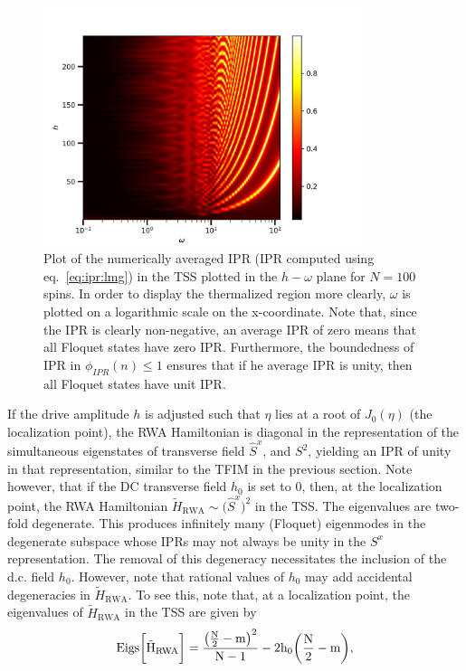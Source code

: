 \documentclass[%
reprint,
superscriptaddress,
amsmath,amssymb,
aps,
prb,
showkeys,
]{revtex4-2}
\begin{document}
\begin{figure}[t!]
	\centering
	\includegraphics[width=9.3cm]{wh_phasespace.jpeg}
	\caption{Plot of the numerically averaged IPR (IPR computed using eq.~\ref{eq:ipr:lmg}) in the TSS plotted in the $h-\omega$ plane for $N=100$ spins. In order to display the thermalized region more clearly, $\omega$ is plotted on a logarithmic scale on the x-coordinate. Note that, since the IPR is clearly non-negative, an average IPR of zero means that all Floquet states have zero IPR. Furthermore, the boundedness of IPR in $\phi_{IPR}(n) \leq 1$ ensures that if he average IPR is unity, then all Floquet states have unit IPR.}
	\label{fig:lmg_phasediag}
\end{figure}
If the drive amplitude $h$ is adjusted such that $\eta$ lies at a root of $J_0(\eta)$ (the localization point), the RWA Hamiltonian is diagonal in the representation of the simultaneous eigenstates of transverse field $\hat{S}^x$, and $S^2$, yielding an IPR of unity in that representation, similar to the TFIM in the previous section. Note however, that if the DC transverse field $h_0$ is set to $0$, then, at the localization point, the RWA Hamiltonian $\tilde{H}_{\mathrm{RWA}}\sim
\big(\hat{S}^x\big)^2$ in the TSS. The eigenvalues are two-fold degenerate. This produces infinitely many (Floquet) eigenmodes in the degenerate subspace whose IPRs may not always be unity in the $S^x$ representation. The removal of this degeneracy necessitates the inclusion of the d.c. field $h_0$. However, note that rational values of $h_0$
may add accidental degeneracies in $\tilde{H}_{\mathrm{RWA}}$. To see this, note that, at a localization point, the eigenvalues of $\tilde{H}_{\mathrm{RWA}}$ in the TSS are given by
\begin{equation}
	\rm{Eigs}\bigg[\tilde{H}_{\mathrm{RWA}}\bigg] = \frac{\big(\frac{N}{2}-m\big)^2}{N-1} - 2h_0 \bigg(\frac{N}{2}-m\bigg),
\end{equation}
\end{document}
